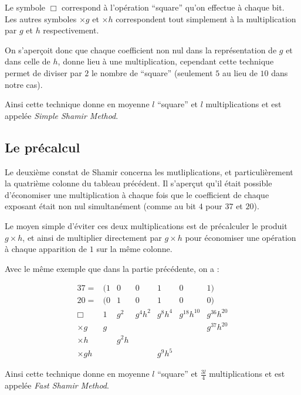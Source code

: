 \documentclass[12pt, a4paper]{memoir}
\begin{document}
 Le symbole $\Box$ correspond à l'opération ``square'' qu'on effectue à chaque bit. \\
 Les autres symboles $\times g$ et $\times h$ correspondent tout simplement à la multiplication par $g$ et $h$ 
 respectivement.
 
 On s'aperçoit donc que chaque coefficient non nul dans la représentation de $g$ et dans celle de $h$, donne lieu
 à une multiplication, cependant cette technique permet de diviser par $2$ le nombre de ``square'' 
 (seulement $5$ au lieu de $10$ dans notre cas).
 
 Ainsi cette technique donne en moyenne $l$ ``square'' et $l$ multiplications et est appelée
 \emph{Simple Shamir Method}.
 
 
\subsection{Le précalcul}

Le deuxième constat de Shamir concerna les mutliplications, et particulièrement la quatrième colonne du tableau
précédent. Il s'aperçut qu'il était possible d'économiser une multiplication à chaque fois que le coefficient de chaque
exposant était non nul simultanément (comme au bit $4$ pour $37$ et $20$).

Le moyen simple d'éviter ces deux multiplications est de précalculer le produit $g \times h$, et ainsi de 
multiplier directement par $g \times h$ pour économiser une opération à chaque apparition de $1$ sur la même colonne.

Avec le même exemple que dans la partie précédente, on a :

  $$\begin{array}{cccccccc}
  37 = & (1 & 0 & 0 & 1 & 0 & 1) \\
  20 = & (0 & 1 & 0 & 1 & 0 & 0) \\
  \Box       & 1  & g^2 & g^4 h^2 & g^8 h^4 & g^{18} h^{10} & g^{36} h^{20} \\
  \times g & g  & \,    &    \,   &    \,   & \,            & g^{37} h^{20} \\
  \times h & \, & g^2 h &    \,   &    \,   & \,            & \, \\
  \times gh & \, & \,   &    \,   & g^9 h^5 & \,            & \,
  \end{array}$$

 Ainsi cette technique donne en moyenne $l$ ``square'' et $\frac{3l}{4}$ multiplications et est appelée
 \emph{Fast Shamir Method}.
\end{document}
